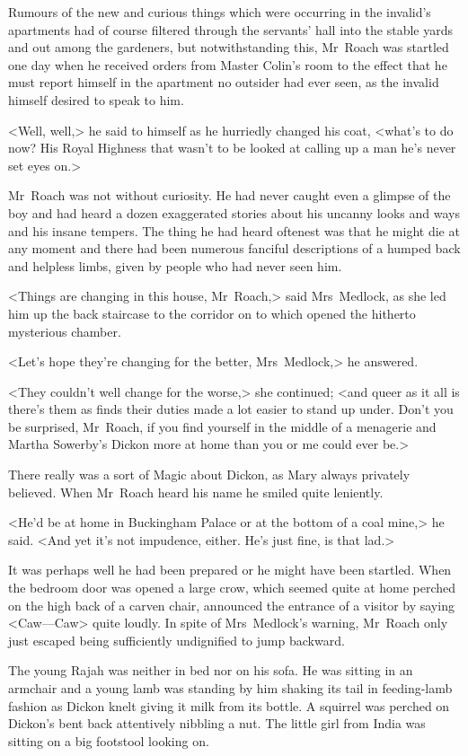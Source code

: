 Rumours of the new and curious things which were occurring in the invalid's apartments had of course filtered through the servants' hall into the stable yards and out among the gardeners, but notwithstanding this, Mr~Roach was startled one day when he received orders from Master Colin's room to the effect that he must report himself in the apartment no outsider had ever seen, as the invalid himself desired to speak to him.

<Well, well,> he said to himself as he hurriedly changed his coat, <what's to do now? His Royal Highness that wasn't to be looked at calling up a man he's never set eyes on.>

Mr~Roach was not without curiosity. He had never caught even a glimpse of the boy and had heard a dozen exaggerated stories about his uncanny looks and ways and his insane tempers. The thing he had heard oftenest was that he might die at any moment and there had been numerous fanciful descriptions of a humped back and helpless limbs, given by people who had never seen him.

<Things are changing in this house, Mr~Roach,> said Mrs~Medlock, as she led him up the back staircase to the corridor on to which opened the hitherto mysterious chamber.

<Let's hope they're changing for the better, Mrs~Medlock,> he answered.

<They couldn't well change for the worse,> she continued; <and queer as it all is there's them as finds their duties made a lot easier to stand up under. Don't you be surprised, Mr~Roach, if you find yourself in the middle of a menagerie and Martha Sowerby's Dickon more at home than you or me could ever be.>

There really was a sort of Magic about Dickon, as Mary always privately believed. When Mr~Roach heard his name he smiled quite leniently.

<He'd be at home in Buckingham Palace or at the bottom of a coal mine,> he said. <And yet it's not impudence, either. He's just fine, is that lad.>

It was perhaps well he had been prepared or he might have been startled. When the bedroom door was opened a large crow, which seemed quite at home perched on the high back of a carven chair, announced the entrance of a visitor by saying <Caw—Caw> quite loudly. In spite of Mrs~Medlock's warning, Mr~Roach only just escaped being sufficiently undignified to jump backward.

The young Rajah was neither in bed nor on his sofa. He was sitting in an armchair and a young lamb was standing by him shaking its tail in feeding-lamb fashion as Dickon knelt giving it milk from its bottle. A squirrel was perched on Dickon's bent back attentively nibbling a nut. The little girl from India was sitting on a big footstool looking on.

